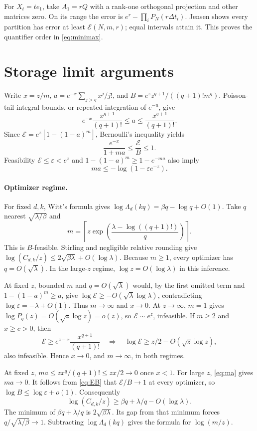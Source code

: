 \documentclass[11pt,a4paper]{article}
\newcommand{\E}{\mathcal E}
\begin{document}
For \(X_t=te_1\), take \(A_1=rQ\) with a rank-one orthogonal projection
and other matrices zero. On its range the error is
\(e^r-\prod_iP_N(r\Delta t_i)\).
Jensen shows every partition has error at least \(\E(N,m,r)\);
equal intervals attain it. This proves the quantifier order in
\eqref{eq:minimax}.

\section{Storage limit arguments}\label{app:asymp}
Write \(x=z/m\), \(a=e^{-x}\sum_{j>q}x^j/j!\), and
\(B=e^z z^{q+1}/((q+1)!m^q)\).
Poisson-tail integral bounds, or repeated integration of \(e^{-u}\), give
\[
 e^{-x}\frac{x^{q+1}}{(q+1)!}\le a\le\frac{x^{q+1}}{(q+1)!}.
\]
Since \(\E=e^z[1-(1-a)^m]\), Bernoulli's inequality yields
\begin{equation}\label{eq:EB}
 \frac{e^{-x}}{1+ma}\le\frac{\E}{B}\le1.
\end{equation}
Feasibility \(\E\le\varepsilon<e^z\) and
\(1-(1-a)^m\ge1-e^{-ma}\) also imply
\begin{equation}\label{eq:ma}
 ma\le-\log(1-\varepsilon e^{-z}).
\end{equation}

\paragraph{Optimizer regime.}
For fixed \(d,k\), Witt's formula gives
\(\log\Lambda_d(kq)=\beta q-\log q+O(1)\).
Take \(q\) nearest \(\sqrt{\lambda/\beta}\) and
\[
 m=\left\lceil z\exp\left(\frac{\lambda-\log((q+1)!)}q\right)\right\rceil.
\]
This is \(B\)-feasible. Stirling and negligible relative rounding give
\(\log(C_{d,k}/z)\le2\sqrt{\beta\lambda}+O(\log\lambda)\).
Because \(m\ge1\), every optimizer has \(q=O(\sqrt\lambda)\).
In the large-\(z\) regime, \(\log z=O(\log\lambda)\) in this inference.

At fixed \(z\), bounded \(m\) and \(q=O(\sqrt\lambda)\) would, by the first
omitted term and \(1-(1-a)^m\ge a\), give
\(\log\E\ge-O(\sqrt\lambda\log\lambda)\), contradicting
\(\log\varepsilon=-\lambda+O(1)\). Thus \(m\to\infty\) and \(x\to0\).
At \(z\to\infty\), \(m=1\) gives
\(\log P_q(z)=O(\sqrt z\log z)=o(z)\), so \(\E\sim e^z\), infeasible.
If \(m\ge2\) and \(x\ge c>0\), then
\[
 \E\ge e^{z-x}\frac{x^{q+1}}{(q+1)!}
 \quad\Longrightarrow\quad
 \log\E\ge z/2-O(\sqrt z\log z),
\]
also infeasible. Hence \(x\to0\), and \(m\to\infty\), in both regimes.

At fixed \(z\), \(ma\le z x^q/(q+1)!\le zx/2\to0\) once \(x<1\).
For large \(z\), \eqref{eq:ma} gives \(ma\to0\).
It follows from \eqref{eq:EB} that \(\E/B\to1\) at every optimizer, so
\(\log B\le\log\varepsilon+o(1)\).
Consequently
\[
 \log(C_{d,k}/z)\ge\beta q+\lambda/q-O(\log\lambda).
\]
The minimum of \(\beta q+\lambda/q\) is \(2\sqrt{\beta\lambda}\).
Its gap from that minimum forces \(q/\sqrt{\lambda/\beta}\to1\).
Subtracting \(\log\Lambda_d(kq)\) gives the formula for \(\log(m/z)\).
\end{document}
